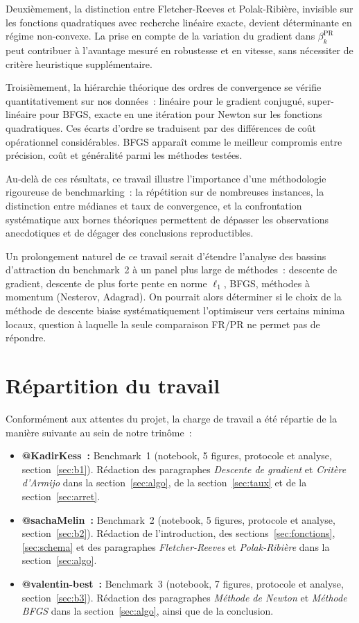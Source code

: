 \documentclass[10pt,a4paper]{article}
\begin{document}
Deuxièmement, la distinction entre Fletcher-Reeves et Polak-Ribière, invisible sur les fonctions quadratiques avec recherche linéaire exacte, devient déterminante en régime non-convexe. La prise en compte de la variation du gradient dans $\beta_k^{\text{PR}}$ peut contribuer à l'avantage mesuré en robustesse et en vitesse, sans nécessiter de critère heuristique supplémentaire.

Troisièmement, la hiérarchie théorique des ordres de convergence se vérifie quantitativement sur nos données~: linéaire pour le gradient conjugué, super-linéaire pour BFGS, exacte en une itération pour Newton sur les fonctions quadratiques. Ces écarts d'ordre se traduisent par des différences de coût opérationnel considérables. BFGS apparaît comme le meilleur compromis entre précision, coût et généralité parmi les méthodes testées.

Au-delà de ces résultats, ce travail illustre l'importance d'une méthodologie rigoureuse de benchmarking~: la répétition sur de nombreuses instances, la distinction entre médianes et taux de convergence, et la confrontation systématique aux bornes théoriques permettent de dépasser les observations anecdotiques et de dégager des conclusions reproductibles.

Un prolongement naturel de ce travail serait d'étendre l'analyse des bassins d'attraction du benchmark~2 à un panel plus large de méthodes~: descente de gradient, descente de plus forte pente en norme $\ell_1$, BFGS, méthodes à momentum (Nesterov, Adagrad). On pourrait alors déterminer si le choix de la méthode de descente biaise systématiquement l'optimiseur vers certains minima locaux, question à laquelle la seule comparaison FR/PR ne permet pas de répondre.

\section*{Répartition du travail}

Conformément aux attentes du projet, la charge de travail a été répartie de la manière suivante au sein de notre trinôme~:
\begin{itemize}
    \item \textbf{@KadirKess~:} Benchmark~1 (notebook, 5 figures, protocole et analyse, section~\ref{sec:b1}). Rédaction des paragraphes \emph{Descente de gradient} et \emph{Critère d'Armijo} dans la section~\ref{sec:algo}, de la section~\ref{sec:taux} et de la section~\ref{sec:arret}.
    \item \textbf{@sachaMelin~:} Benchmark~2 (notebook, 5 figures, protocole et analyse, section~\ref{sec:b2}). Rédaction de l'introduction, des sections~\ref{sec:fonctions}, \ref{sec:schema} et des paragraphes \emph{Fletcher-Reeves} et \emph{Polak-Ribière} dans la section~\ref{sec:algo}.
    \item \textbf{@valentin-best~:} Benchmark~3 (notebook, 7 figures, protocole et analyse, section~\ref{sec:b3}). Rédaction des paragraphes \emph{Méthode de Newton} et \emph{Méthode BFGS} dans la section~\ref{sec:algo}, ainsi que de la conclusion.
\end{itemize}
\end{document}
